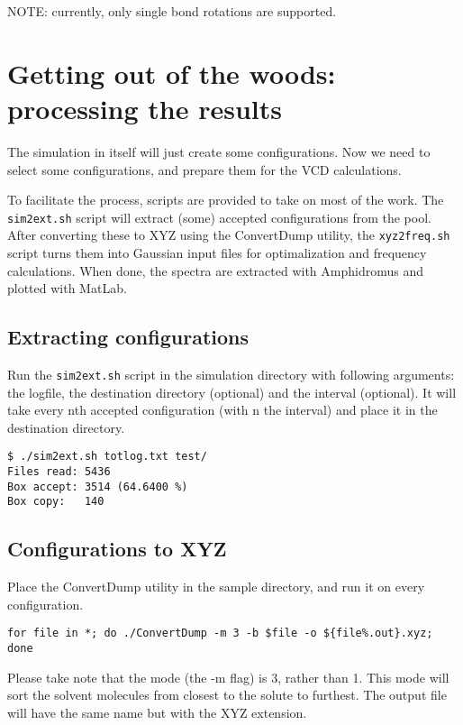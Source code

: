 NOTE: currently, only single bond rotations are supported.
	
	\chapter{Getting out of the woods: processing the results}

The simulation in itself will just create some configurations. Now we need to 
select some configurations, and prepare them for the VCD calculations.

To facilitate the process, scripts are provided to take on most of the work. 
The \verb|sim2ext.sh| script will extract (some) accepted configurations from 
the 
pool. After converting these to XYZ using the ConvertDump utility, the 
\verb|xyz2freq.sh| script turns them into Gaussian input files for 
optimalization and frequency calculations.
When done, the spectra are extracted with Amphidromus and plotted with MatLab.

\section{Extracting configurations}

Run the \verb|sim2ext.sh| script in the simulation directory with following 
arguments: the logfile, the destination directory (optional) and the interval 
(optional). It will take every nth accepted configuration (with n the interval)
and place it in the destination directory.

\begin{lstlisting}[caption=The sim2ext script]
$ ./sim2ext.sh totlog.txt test/
Files read: 5436
Box accept: 3514 (64.6400 %)
Box copy:   140
\end{lstlisting}

\section{Configurations to XYZ}

Place the ConvertDump utility in the sample directory, and run it on every 
configuration.

\begin{lstlisting}[caption=Using the ConvertDump utility to make XYZ's]
for file in *; do ./ConvertDump -m 3 -b $file -o ${file%.out}.xyz; done
\end{lstlisting}

Please take note that the mode (the -m flag) is 3, rather than 1. This mode 
will sort the solvent molecules from closest to the solute to furthest. 
The output file will have the same name but with the XYZ extension.

